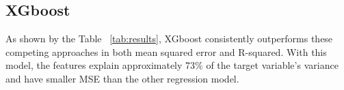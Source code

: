 \subsection{XGboost}

As shown by the Table ~\ref{tab:results}, XGboost consistently outperforms these
competing approaches in both mean squared error and R-squared.  With this model,
the features explain approximately 73\% of the target variable's variance and
have smaller MSE than the other regression model.


